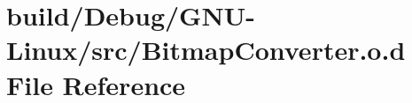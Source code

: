 \hypertarget{BitmapConverter_8o_8d}{}\section{build/\+Debug/\+G\+N\+U-\/\+Linux/src/\+Bitmap\+Converter.o.\+d File Reference}
\label{BitmapConverter_8o_8d}
